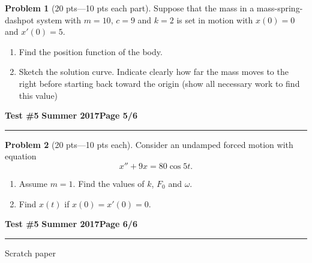 \documentclass[12pt]{article}
\theoremstyle{definition}
\newtheorem{problem}{Problem}
\begin{document}
\bigskip
\begin{problem}[20 pts---10 pts each part]
Suppose that the mass in a mass-spring-dashpot system with $m=10$, $c=9$ and $k=2$ is set in motion with $x(0)=0$ and $x'(0)=5$.
\begin{enumerate}
  \item Find the position function of the body.
  \vspace{4cm}
  \begin{flushright}
  \end{flushright}
  \item Sketch the solution curve.  Indicate clearly how far the mass moves to the right before starting back toward the origin (show all necessary work to find this value)
\end{enumerate}
\end{problem}
\newpage

\hfill{\large\bf Test \#5}\hfill{\large\bf
  Summer 2017}\hfill{\large\bf Page 5/6}\hrule

\bigskip
\begin{problem}[20 pts---10 pts each]
Consider an undamped forced motion with equation 
\begin{equation*}
x''+9x=80\cos 5t.
\end{equation*}
\begin{enumerate}
  \item Assume $m=1$.  Find the values of $k$, $F_0$ and $\omega$.
  \begin{flushright}
  \end{flushright}
  \item Find $x(t)$ if $x(0)=x'(0)=0$.
  \vspace{16cm}
  \begin{flushright}
  \end{flushright}
\end{enumerate}
\end{problem}
\newpage

\hfill{\large\bf Test \#5}\hfill{\large\bf
  Summer 2017}\hfill{\large\bf Page 6/6}\hrule

\bigskip
\Large Scratch paper
\end{document}
